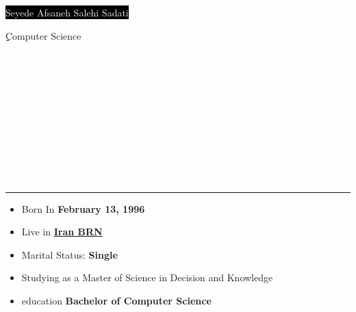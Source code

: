 \documentclass[8pt]{developercv}
\begin{document}
\begin{minipage}[t]{0.50\textwidth} 
	\vspace{-\baselineskip} 
	\vspace{5pt}
	\colorbox{black}{\Huge{\textcolor{white}{Seyede Afsaneh Salehi Sadati}}}
	\vspace{5pt}

	{\LARGE {\color{gray}ِِComputer Science}} 

\end{minipage}
\\
\begin{minipage}[t]{0.25\textwidth} 
	\vspace{-\baselineskip}
	\vspace{20pt}
	\\\\
	\\\\
          \\\\
	\\\\

\end{minipage}
\vspace{0.5cm}

\noindent\rule{\textwidth}{1pt}

\vspace{15pt} 

\begin{minipage}[t]{0.5\textwidth} 
	\vspace{-\baselineskip} 

	\Large {
	\begin{itemize}
		\item {Born In \textbf{February 13, 1996}}
		\item {Live in
		\href{Iiran,+Iran}
		{\textbf{Iran BRN}}}
		\item {Marital Status: \textbf{Single} }
                     \item{Studying as a Master of Science in Decision and Knowledge}
                     \item{education \textbf{Bachelor of Computer Science }}
	\end{itemize}
	}

\end{minipage}
\hfill 
\begin{minipage}[t]{0.4\textwidth} 
	\vspace{-\baselineskip} 
	\begin{barchart}{4.5}
	\end{barchart}
\end{minipage}
\end{document}
